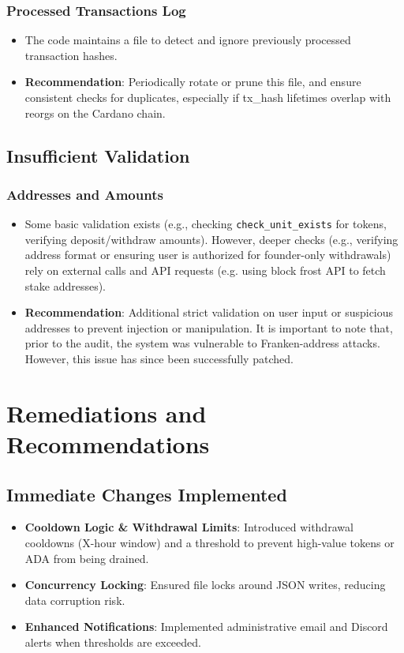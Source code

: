 \documentclass[11pt,a4paper]{article}
\begin{document}
\subsubsection{Processed Transactions Log}
\begin{itemize}
    \item The code maintains a file to detect and ignore previously processed transaction hashes.
    \item \textbf{Recommendation}: Periodically rotate or prune this file, and ensure consistent checks for duplicates, especially if tx\_hash lifetimes overlap with reorgs on the Cardano chain.
\end{itemize}

\subsection{Insufficient Validation}

\subsubsection{Addresses and Amounts}
\begin{itemize}
    \item Some basic validation exists (e.g., checking \texttt{check\_unit\_exists} for tokens, verifying deposit/withdraw amounts). However, deeper checks (e.g., verifying address format or ensuring user is authorized for founder-only withdrawals) rely on external calls and API requests (e.g. using block frost API to fetch stake addresses).
    \item \textbf{Recommendation}: Additional strict validation on user input or suspicious addresses to prevent injection or manipulation. It is important to note that, prior to the audit, the system was vulnerable to Franken-address attacks. However, this issue has since been successfully patched.
\end{itemize}

\section{Remediations and Recommendations}

\subsection{Immediate Changes Implemented}
\begin{itemize}
    \item \textbf{Cooldown Logic \& Withdrawal Limits}: Introduced withdrawal cooldowns (X-hour window) and a threshold to prevent high-value tokens or ADA from being drained.
    \item \textbf{Concurrency Locking}: Ensured file locks around JSON writes, reducing data corruption risk.
    \item \textbf{Enhanced Notifications}: Implemented administrative email and Discord alerts when thresholds are exceeded.
\end{itemize}
\end{document}

